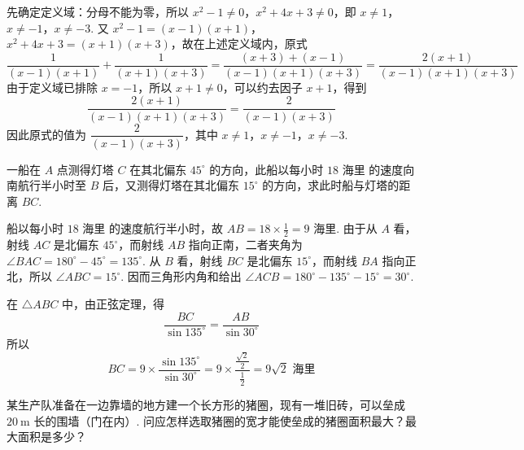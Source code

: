 \begin{solution}
先确定定义域：分母不能为零，所以 \(x^2-1\ne0\)，\(x^2+4x+3\ne0\)，即
\(x\ne1\)，\(x\ne-1\)，\(x\ne-3\). 又
\(x^2-1=\left(x-1\right)\left(x+1\right)\)，
\(x^2+4x+3=\left(x+1\right)\left(x+3\right)\)，故在上述定义域内，原式
\[
\frac{1}{\left(x-1\right)\left(x+1\right)}+\frac{1}{\left(x+1\right)\left(x+3\right)}
=\frac{(x+3)+(x-1)}{\left(x-1\right)\left(x+1\right)\left(x+3\right)}
=\frac{2\left(x+1\right)}{\left(x-1\right)\left(x+1\right)\left(x+3\right)}
\]
由于定义域已排除 \(x=-1\)，所以 \(x+1\ne0\)，可以约去因子 \(x+1\)，得到
\[
\frac{2\left(x+1\right)}{\left(x-1\right)\left(x+1\right)\left(x+3\right)}=\frac{2}{\left(x-1\right)\left(x+3\right)}
\]
因此原式的值为 \(\dfrac{2}{\left(x-1\right)\left(x+3\right)}\)，其中 \(x\ne1\)，\(x\ne-1\)，\(x\ne-3\).
\end{solution}

\begin{problem}
一船在 \(A\) 点测得灯塔 \(C\) 在其北偏东 \(45^\circ\) 的方向，此船以每小时 \(18\text{ 海里}\) 的速度向南航行半小时至 \(B\) 后，又测得灯塔在其北偏东 \(15^\circ\) 的方向，求此时船与灯塔的距离 \(BC\).

\end{problem}

\begin{solution}
船以每小时 \(18\text{ 海里}\) 的速度航行半小时，故
\(AB=18\times\frac{1}{2}=9\text{ 海里}\). 由于从 \(A\) 看，射线 \(AC\) 是北偏东 \(45^\circ\)，而射线 \(AB\) 指向正南，二者夹角为
\(\angle BAC=180^\circ-45^\circ=135^\circ\). 从 \(B\) 看，射线 \(BC\) 是北偏东 \(15^\circ\)，而射线 \(BA\) 指向正北，所以
\(\angle ABC=15^\circ\). 因而三角形内角和给出
\(\angle ACB=180^\circ-135^\circ-15^\circ=30^\circ\).

在 \(\triangle ABC\) 中，由正弦定理，得
\[
\frac{BC}{\sin135^\circ}=\frac{AB}{\sin30^\circ}
\]
所以
\[
BC=9\times\frac{\sin135^\circ}{\sin30^\circ}=9\times\frac{\frac{\sqrt{2}}{2}}{\frac{1}{2}}=9\sqrt{2}\text{ 海里}
\]
\end{solution}

\begin{problem}
某生产队准备在一边靠墙的地方建一个长方形的猪圈，现有一堆旧砖，可以垒成 \(20\mathrm{~m}\) 长的围墙（门在内）. 问应怎样选取猪圈的宽才能使垒成的猪圈面积最大？最大面积是多少？

\end{problem}

